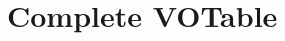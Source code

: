 \documentclass[11pt,a4paper]{ivoa}
\begin{document}
\section{Complete VOTable}\label{appen_votable}




\end{document}
